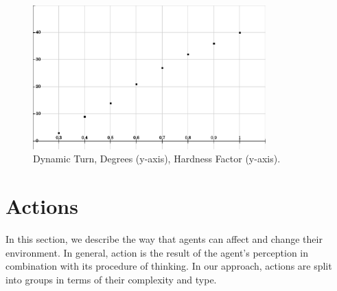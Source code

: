 \begin{figure}[t!]
\centering
  \includegraphics[width=0.8\textwidth]{Chapter3/figures/DynamicTurn.pdf}
  \caption{Dynamic Turn, Degrees (y-axis), Hardness Factor (y-axis).}
  \label{fig:Turn}
\end{figure}


\section{Actions}
In this section, we describe the way that agents can affect and change their environment. In general, action is the result of the agent's perception in combination with its procedure of thinking. In our approach, actions are split into groups in terms of their complexity and type.

